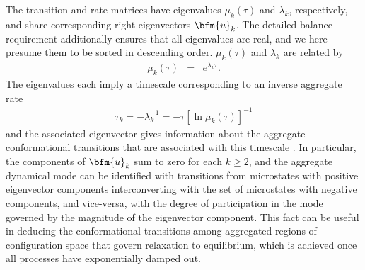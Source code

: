 The transition and rate matrices have eigenvalues $\mu_k(\tau)$ and $\lambda_k$, respectively, and share corresponding right eigenvectors $\bfm{u}_k$.
The detailed balance requirement additionally ensures that all eigenvalues are real, and we here presume them to be sorted in descending order.
$\mu_k(\tau)$ and $\lambda_k$ are related by
\begin{eqnarray}
\mu_k(\tau) &=& e^{\lambda_k \tau} . \label{equation:implied-timescales}
\end{eqnarray}
The eigenvalues each imply a timescale corresponding to an inverse aggregate rate
\begin{eqnarray}
\tau_k = - \lambda_k^{-1} = - \tau [ \ln \mu_k(\tau) ]^{-1} \label{equation:implied-timescales}
\end{eqnarray}
and the associated eigenvector gives information about the aggregate conformational transitions that are associated with this timescale \cite{schuette-thesis,schuette:1999a,huisinga-thesis,schuette:2002a}.
In particular, the components of $\bfm{u}_k$ sum to zero for each $k \ge 2$, and the aggregate dynamical mode can be identified with transitions from microstates with positive eigenvector components interconverting with the set of microstates with negative components, and vice-versa, with the degree of participation in the mode governed by the magnitude of the eigenvector component.
This fact can be useful in deducing the conformational transitions among aggregated regions of configuration space that govern relaxation to equilibrium, which is achieved once all processes have exponentially damped out.

